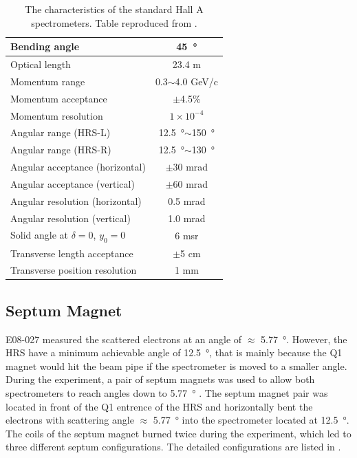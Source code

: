 \begin{table}[p!]
  \centering
  \begin{tabular}{|l|c|}
    \hline\hline
    Bending angle & \SI{45}{\degree} \\ \hline
    Optical length & 23.4 m \\ \hline
    Momentum range & 0.3$\sim$4.0 GeV/c \\ \hline
    Momentum acceptance & $\pm$4.5\% \\ \hline
    Momentum resolution & $1\times10^{-4}$ \\ \hline
    Angular range (HRS-L) & \SI{12.5}{\degree}$\sim$\SI{150}{\degree} \\ \hline
    Angular range (HRS-R) & \SI{12.5}{\degree}$\sim$\SI{130}{\degree} \\ \hline
    Angular acceptance (horizontal) & $\pm$30 mrad \\ \hline
    Angular acceptance (vertical) & $\pm$60 mrad \\ \hline
    Angular resolution (horizontal) & 0.5 mrad \\ \hline
    Angular resolution (vertical) & 1.0 mrad \\ \hline
    Solid angle at $\delta=0$, $y_0=0$ & 6 msr \\ \hline
    Transverse length acceptance & $\pm$5 cm \\ \hline
    Transverse position resolution & 1 mm \\ \hline
  \end{tabular}
  \caption[The characteristics of the HRS.]{The characteristics of the standard Hall A spectrometers. Table reproduced from \cite{Alcorn2004}. \label{C5S4T1}}
\end{table}

\subsection{Septum Magnet}
\label{C5S4SS1}

E08-027 measured the scattered electrons at an angle of $\approx$ \SI{5.77}{\degree}. However, the HRS have a minimum achievable angle of \SI{12.5}{\degree}, that is mainly because the Q1 magnet would hit the beam pipe if the spectrometer is moved to a smaller angle. During the experiment, a pair of septum magnets was used to allow both spectrometers to reach angles down to \SI{5.77}{\degree} \cite{G2P}. The septum magnet pair was located in front of the Q1 entrence of the HRS and horizontally bent the electrons with scattering angle $\approx$ \SI{5.77}{\degree} into the spectrometer located at \SI{12.5}{\degree}. The coils of the septum magnet burned twice during the experiment, which led to three different septum configurations. The detailed configurations are listed in .


